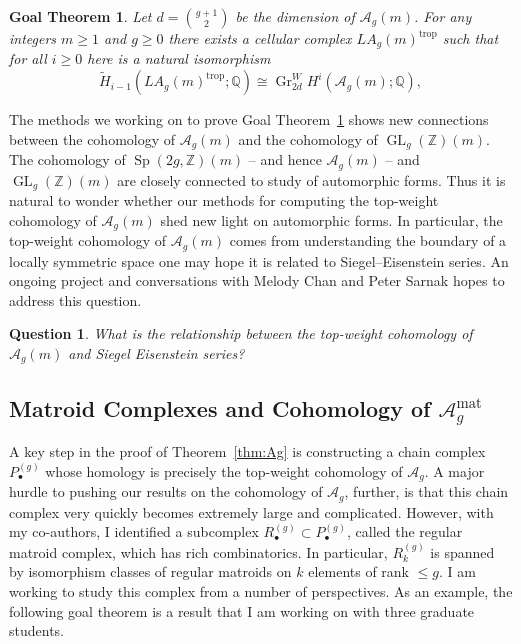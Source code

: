 \documentclass[11pt,reqno]{amsart}
\newtheorem{goalTheorem}[lemma]{Goal Theorem}
\newtheorem{question}[lemma]{Question}
\theoremstyle{remark}
\newcommand{\Gr}{\operatorname{Gr}}
\newcommand{\GL}{{\operatorname{GL}}}
\newcommand{\Sp}{\operatorname{Sp}}
\newcommand{\trop}{\operatorname{trop}}
\newcommand{\cA}{\mathcal{A}}
\newcommand{\Q}{\mathbb{Q}}
\newcommand{\Z}{\mathbb{Z}}
\begin{document}
\begin{goalTheorem}\label{goalThm:agm}
Let $d=\binom{g+1}{2}$ be the dimension of $\cA_{g}(m)$. For any integers $m\geq1$ and $g\geq0$ there exists a cellular complex $LA_{g}(m)^{\trop}$ such that for all $i\geq0$ here is a natural isomorphism
\[
\tilde{H}_{i-1}\left(LA_{g}(m)^{\trop};\Q\right) \cong \Gr_{2d}^W\!H^{i}\left(\cA_{g}(m);\mathbb{Q}\right),
\]
\end{goalTheorem}

The methods we working on to prove Goal Theorem~\ref{goalThm:agm} shows new connections between the cohomology of $\cA_{g}(m)$ and the cohomology of $\GL_{g}(\Z)(m)$. The cohomology of $\Sp(2g,\Z)(m)$ -- and hence  $\cA_{g}(m)$ -- and $\GL_{g}(\Z)(m)$ are closely connected to study of automorphic forms. Thus it is natural to wonder whether our methods for computing the top-weight cohomology of $\cA_{g}(m)$ shed new light on automorphic forms. In particular, the top-weight cohomology of $\cA_{g}(m)$ comes from understanding the boundary of a locally symmetric space one may hope it is related to Siegel--Eisenstein series. An ongoing project and conversations with Melody Chan and Peter Sarnak hopes to address this question.

\begin{question}
What is the relationship between the top-weight cohomology of $\cA_{g}(m)$ and Siegel Eisenstein series?
\end{question}

\subsection{Matroid Complexes and Cohomology of $\cA_{g}^{\text{mat}}$}

A key step in the proof of Theorem~\ref{thm:Ag} is constructing a chain complex $P^{(g)}_{\bullet}$ whose homology is precisely the top-weight cohomology of $\cA_{g}$. A major hurdle to pushing our results on the cohomology of $\cA_{g}$, further, is that this chain complex very quickly becomes extremely large and complicated. However,  with my co-authors, I identified a subcomplex $R^{(g)}_{\bullet} \subset P^{(g)}_{\bullet}$, called the regular matroid complex, which has rich combinatorics. In particular, $R^{(g)}_{k}$ is spanned by isomorphism classes of regular matroids on $k$ elements of rank $\leq g$.  I am working to study this complex from a number of perspectives. As an example, the following goal theorem is a result that I am working on with three graduate students.
\end{document}
